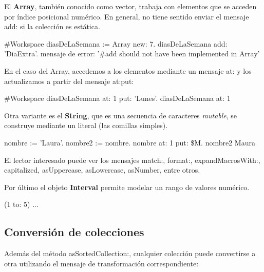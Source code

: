 \documentclass[a4paper,12pt]{book}
\begin{document}
\vspace{\baselineskip}
El \textbf{Array}, también conocido como vector, trabaja con elementos que se acceden por índice posicional
numérico.
\newline
\newline
En general, no tiene sentido enviar el mensaje add: si la colección es estática.

\begin{code}
#Workspace
diasDeLaSemana := Array new: 7.
diasDeLaSemana add: 'DiaExtra'.   
{mensaje de error: '#add should not have been implemented in Array'}
\end{code}

\vspace{\baselineskip}
En el caso del Array, accedemos a los elementos mediante un mensaje at: y los actualizamos a partir del mensaje
at:put:

\begin{code}
#Workspace
diasDeLaSemana at: 1 put: 'Lunes'.
diasDeLaSemana at: 1
\end{code}

\vspace{\baselineskip}
Otra variante es el \textbf{String}, que es una secuencia de caracteres \textit{mutable}, se construye
mediante un literal (las comillas simples).

\begin{code}
nombre := 'Laura'.
nombre2 := nombre.
nombre at: 1 put: \$M.
nombre2
    Maura
\end{code}

\vspace{\baselineskip}
El lector interesado puede ver los mensajes match:, format:, expandMacrosWith:, capitalized, asUppercase,
asLowercase, asNumber, entre otros.

\vspace{\baselineskip}
Por último el objeto \textbf{Interval} permite modelar un rango de valores numérico.

\begin{code}
(1 to: 5) ...
\end{code}

\subsection{Conversión de colecciones}

Además del método asSortedCollection:, cualquier colección puede convertirse a otra utilizando el mensaje
de transformación correspondiente:
\end{document}

